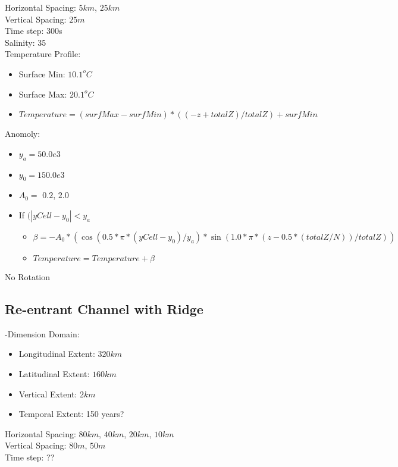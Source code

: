 \documentclass[11pt]{report}
\begin{document}
\noindent Horizontal Spacing: $5km$, $25km$ \\
\noindent Vertical Spacing: $25m$ \\
\noindent Time step: 300s \\

\noindent Salinity: 35 \\

\noindent Temperature Profile:
\begin{itemize}
	\item Surface Min: $10.1^oC$
	\item Surface Max: $20.1^oC$
	\item $Temperature = (surfMax - surfMin) * ( (-z + totalZ)/ totalZ) + surfMin$
\end{itemize}

\noindent Anomoly:
\begin{itemize}
	\item $y_a = 50.0e3$
	\item $y_0 = 150.0e3$
	\item $A_0 =$ $0.2$, $2.0$
	\item If $( |yCell - y_0| < y_a $
		\begin{itemize}
			\item $\beta = -A_0 * (\cos(0.5 * \pi * (yCell - y_0)/y_a)*\sin(1.0 * \pi * (z - 0.5*(totalZ/N))/totalZ))$
			\item $Temperature = Temperature + \beta$
		\end{itemize}
\end{itemize}

\noindent No Rotation \\

\subsection{Re-entrant Channel with Ridge}

-Dimension Domain:
\begin{itemize}
	\item Longitudinal Extent: $320km$
	\item Latitudinal Extent: $160km$
	\item Vertical Extent: $2km$
	\item Temporal Extent: 150 years?
\end{itemize}

\noindent Horizontal Spacing: $80km$, $40km$, $20km$, $10km$ \\
\noindent Vertical Spacing: $80m$, $50m$ \\
\noindent Time step: ?? \\
\end{document}
